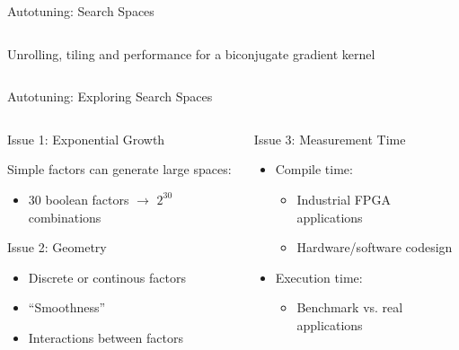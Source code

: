 \documentclass[10pt, compress, aspectratio=169, xcolor={table,usenames,dvipsnames}]{beamer}
\begin{document}
\begin{frame}[label={sec:orge46b803}]{Autotuning: Search Spaces}
\begin{columns}
\begin{column}{0.6\columnwidth}
\begin{center}
{\footnotesize
Unrolling, tiling and performance for a biconjugate gradient kernel
}
\end{center}
\end{column}
\end{columns}
\end{frame}

\begin{frame}[label={sec:org0b58b8b}]{Autotuning: Exploring Search Spaces}
\begin{columns}
\begin{column}{0.5\columnwidth}
\begin{block}{Issue 1: \alert{Exponential Growth}}
\vspace{.2cm}

Simple factors can generate large spaces:

\begin{itemize}
\item 30 boolean factors \(\rightarrow\) \(2^{30}\) combinations
\end{itemize}

\begin{block}{Issue 2: \alert{Geometry}}
\begin{itemize}
\item Discrete or continous factors
\item ``Smoothness''
\item Interactions between factors
\end{itemize}
\end{block}
\end{block}
\end{column}

\begin{column}{0.5\columnwidth}
\begin{block}{Issue 3: \alert{Measurement Time}}
\vspace{.2cm}

\begin{itemize}
\item Compile time:
\begin{itemize}
\item Industrial FPGA applications
\item Hardware/software codesign
\end{itemize}
\item Execution time:
\begin{itemize}
\item Benchmark vs. real applications
\end{itemize}
\end{itemize}
\end{block}
\end{column}
\end{columns}
\end{frame}
\end{document}
